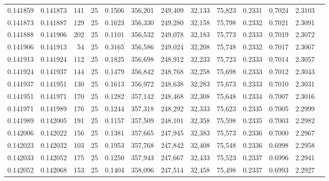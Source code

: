 \begin{tabular}{rrrrrrrrrrrrr}
0.141859 & 0.141873 &   141 &  25 &                                     0.1506 & 356,201 & 249,409 &  32,133 &  75,823 & 0.2331 & 0.7024 & 2.3103 \\
0.141873 & 0.141887 &   129 &  25 &                                     0.1623 & 356,330 & 249,280 &  32,158 &  75,798 & 0.2332 & 0.7021 & 2.3091 \\
0.141888 & 0.141906 &   202 &  25 &                                     0.1101 & 356,532 & 249,078 &  32,183 &  75,773 & 0.2333 & 0.7019 & 2.3072 \\
0.141906 & 0.141913 &    54 &  25 &                                     0.3165 & 356,586 & 249,024 &  32,208 &  75,748 & 0.2332 & 0.7017 & 2.3067 \\
0.141913 & 0.141924 &   112 &  25 &                                     0.1825 & 356,698 & 248,912 &  32,233 &  75,723 & 0.2333 & 0.7014 & 2.3057 \\
0.141924 & 0.141937 &   144 &  25 &                                     0.1479 & 356,842 & 248,768 &  32,258 &  75,698 & 0.2333 & 0.7012 & 2.3043 \\
0.141937 & 0.141951 &   130 &  25 &                                     0.1613 & 356,972 & 248,638 &  32,283 &  75,673 & 0.2333 & 0.7010 & 2.3031 \\
0.141951 & 0.141971 &   170 &  25 &                                     0.1282 & 357,142 & 248,468 &  32,308 &  75,648 & 0.2334 & 0.7007 & 2.3016 \\
0.141971 & 0.141989 &   176 &  25 &                                     0.1244 & 357,318 & 248,292 &  32,333 &  75,623 & 0.2335 & 0.7005 & 2.2999 \\
0.141989 & 0.142005 &   191 &  25 &                                     0.1157 & 357,509 & 248,101 &  32,358 &  75,598 & 0.2335 & 0.7003 & 2.2982 \\
0.142006 & 0.142022 &   156 &  25 &                                     0.1381 & 357,665 & 247,945 &  32,383 &  75,573 & 0.2336 & 0.7000 & 2.2967 \\
0.142023 & 0.142032 &   103 &  25 &                                     0.1953 & 357,768 & 247,842 &  32,408 &  75,548 & 0.2336 & 0.6998 & 2.2958 \\
0.142033 & 0.142052 &   175 &  25 &                                     0.1250 & 357,943 & 247,667 &  32,433 &  75,523 & 0.2337 & 0.6996 & 2.2941 \\
0.142052 & 0.142068 &   153 &  25 &                                     0.1404 & 358,096 & 247,514 &  32,458 &  75,498 & 0.2337 & 0.6993 & 2.2927 \\

\end{tabular}
